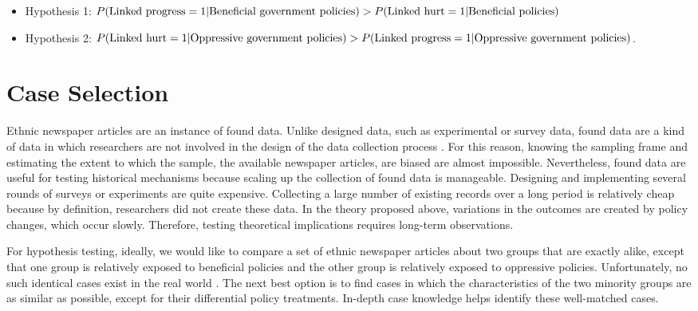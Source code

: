 \documentclass[12 pt]{article}
\begin{document}
\begin{itemize}
    \item Hypothesis 1:  $P(\textrm{Linked progress} = 1|\textrm{Beneficial government policies}) > \\
    P(\textrm{Linked hurt} = 1 | \textrm{Beneficial policies})$
    \item Hypothesis 2: $P(\textrm{Linked hurt} = 1| \textrm{Oppressive government policies}) > \\
    P(\textrm{Linked progress} = 1 | \textrm{Oppressive government policies})$. 
\end{itemize}

\section{Case Selection}
Ethnic newspaper articles are an instance of found data. Unlike designed data, such as experimental or survey data, found data are a kind of data in which researchers are not involved in the design of the data collection process \citep[82]{salganik2019bit}. For this reason, knowing the sampling frame and estimating the extent to which the sample, the available newspaper articles, are biased are almost impossible. Nevertheless, found data are useful for testing historical mechanisms because scaling up the collection of found data is manageable. Designing and implementing several rounds of surveys or experiments are quite expensive. Collecting a large number of existing records over a long period is relatively cheap because by definition, researchers did not create these data. In the theory proposed above, variations in the outcomes are created by policy changes, which occur slowly. Therefore, testing theoretical implications requires long-term observations. 

For hypothesis testing, ideally, we would like to compare a set of ethnic newspaper articles about two groups that are exactly alike, except that one group is relatively exposed to beneficial policies and the other group is relatively exposed to oppressive policies. Unfortunately, no such identical cases exist in the real world \citep[947]{holland1986statistics}. The next best option is to find cases in which the characteristics of the two minority groups are as similar as possible, except for their differential policy treatments. In-depth case knowledge helps identify these well-matched cases.
\end{document}
